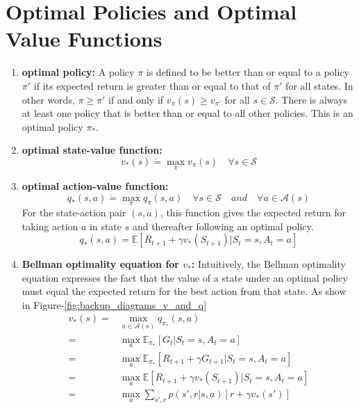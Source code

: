 \section{Optimal Policies and Optimal Value Functions}
\begin{enumerate}
    \item \textbf{optimal policy:} A policy $\pi$ is defined to be better than or equal to a policy $\pi '$ if its expected return is greater than or equal to that of $\pi '$ for all states. In other words, $\pi \geq \pi '$ if and only if $v_{\pi}(s) \geq v_{\pi '}$ for all $s \in \mathcal{S}$. There is always at least one policy that is better than or equal to all other policies. This is an optimal policy $\pi_{*}$.

    \item \textbf{optimal state-value function:} 
        \begin{equation}
            v_{*}(s) \dot{=} \max_{\pi} v_{\pi}(s) \quad \forall s \in \mathcal{S}
        \end{equation}

    \item \textbf{optimal action-value function:}
        \begin{equation}
            q_{*}(s,a) \dot{=} \max_{\pi} q_{\pi}(s, a) \quad \forall s \in \mathcal{S} \quad and \quad \forall a \in \mathcal{A}(s)        
        \end{equation}
    For the state-action pair $(s, a)$, this function gives the expected return for taking action $a$ in state $s$ and thereafter following an optimal policy.
        \begin{equation}
            q_{*}(s,a) = \mathbb{E}[R_{t+1} + \gamma v_{*}(S_{t+1})|S_t=s, A_t=a]
        \end{equation}

    \item \textbf{Bellman optimality equation for $v_*$:} Intuitively, the Bellman optimality equation expresses the fact that the value of a state under an optimal policy must equal the expected return for the best action from that state. As show in Figure-\ref{fig:backup_diagrams_v_and_q}
    \begin{equation}
    \begin{split}
        v_*(s) = & \max_{a \in \mathcal{A}(s)} q_{\pi_*}(s,a) \\
            = & \max_a \mathbb{E}_{\pi_*}[G_t|S_t=s, A_t=a] \\
            = & \max_a \mathbb{E}_{\pi_*}[R_{t+1} + \gamma G_{t+1}|S_t=s,A_t=a] \\
            = & \max_a \mathbb{E}[R_{t+1} + \gamma v_*(S_{t+1})|S_t=s, A_t=a] \\
            = & \max_a \sum_{s', r} p(s',r|s,a)[r + \gamma v_*(s')]
    \end{split}
    \end{equation}


\end{enumerate}
